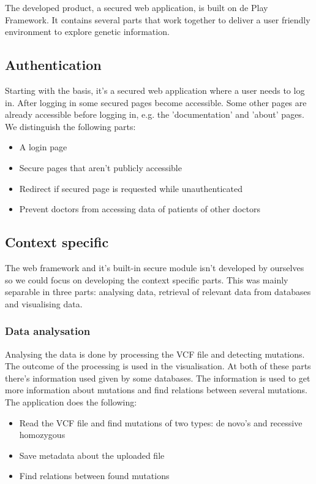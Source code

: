 The developed product, a secured web application, is built on de Play Framework. It contains several parts that work together to deliver a user friendly environment to explore genetic information.

\subsection{Authentication}

Starting with the basis, it's a secured web application where a user needs to log in. After logging in some secured pages become accessible. Some other pages are already accessible before logging in, e.g. the 'documentation' and 'about' pages. We distinguish the following parts:

\begin{itemize}
  \item A login page
  \item Secure pages that aren't publicly accessible
  \item Redirect if secured page is requested while unauthenticated
  \item Prevent doctors from accessing data of patients of other doctors
\end{itemize}

\subsection{Context specific}

The web framework and it's built-in secure module isn't developed by ourselves so we could focus on developing the context specific parts. This was mainly separable in three parts: analysing data, retrieval of relevant data from databases and visualising data.

\subsubsection{Data analysation}

Analysing the data is done by processing the VCF file and detecting mutations. The outcome of the processing is used in the visualisation. At both of these parts there's information used given by some databases. The information is used to get more information about mutations and find relations between several mutations. The application does the following:

\begin{itemize}
  \item Read the VCF file and find mutations of two types: de novo's and recessive homozygous
  \item Save metadata about the uploaded file
  \item Find relations between found mutations
\end{itemize}


